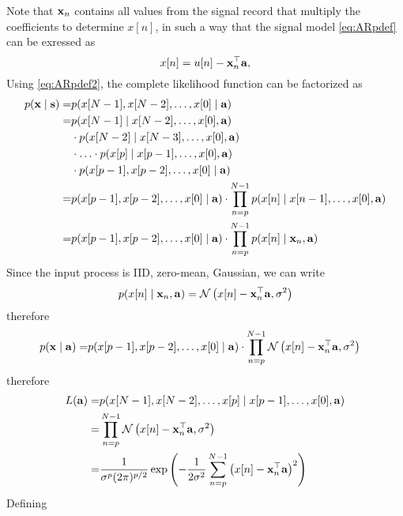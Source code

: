 Note that ${\bf x}_n$ contains all values from the signal record that multiply the coefficients to determine $x[n]$, in such a way that the signal model \eqref{eq:ARpdef} can be exressed as
\begin{equation}
\label{eq:ARpdef2}
x[n]  = u[n] - {\bf x}_n^\top {\bf a},
\end{equation}
Using \eqref{eq:ARpdef2}, the complete likelihood function can be factorized as
\begin{align}
p({\bf x} \mid {\bf s}) 
      =& p(x[N-1],x[N-2],\ldots,x[0] \mid {\bf a})     \nonumber\\
      =& p(x[N-1] \mid  x[N-2], \ldots,x[0 ], {\bf a})         \nonumber\\
	   &\cdot p(x[N-2] \mid  x[N-3], \ldots,x[0], {\bf a})    \nonumber\\
	   &\cdot \ldots 
        \cdot p(x[p] \mid  x[p-1], \ldots,x[0], {\bf a})      \nonumber\\
       &\cdot p(x[p-1], x[p-2], \ldots, x[0 ] \mid {\bf a})    \nonumber\\
      =& p(x[p-1], x[p-2], \ldots, x[0 ] \mid {\bf a})
         \cdot\prod_{n=p}^{N-1} p(x[n] \mid  x[n-1], \ldots,x[0], {\bf a})         \nonumber\\
      =& p(x[p-1], x[p-2], \ldots, x[0 ] \mid {\bf a})
         \cdot\prod_{n=p}^{N-1} p(x[n] \mid  {\bf x}_n, {\bf a})
\end{align}
Since the input process is IID, zero-mean, Gaussian, we can write
\begin{align}
p(x[n] \mid  {\bf x}_n, {\bf a})
	= {\cal N}\left(x[n] - {\bf x}_n^\top{\bf a}, \sigma^2 \right)
\end{align}
therefore
\begin{align}
p({\bf x} \mid {\bf a}) 
      =& p(x[p-1], x[p-2], \ldots, x[0 ] \mid {\bf a})
         \cdot\prod_{n=p}^{N-1} {\cal N}\left(x[n] - {\bf x}_n^\top{\bf a}, \sigma^2 \right)
\end{align}
therefore
\begin{align}
L({\bf a}) 
      =& p(x[N-1],x[N-2],\ldots,x[p] \mid x[p-1], \ldots, x[0], {\bf a})   \nonumber\\
      =& \prod_{n=p}^{N-1} {\cal N}\left(x[n] - {\bf x}_n^\top{\bf a}, \sigma^2 \right) \nonumber\\
      =& \frac{1}{\sigma^p (2\pi)^{p/2}} 
         \exp\left(
              - \frac1{2\sigma^2} \sum_{n=p}^{N-1} \left(x[n] - {\bf x}_n^\top{\bf a}\right)^2 
              \right)
\end{align}
Defining 
